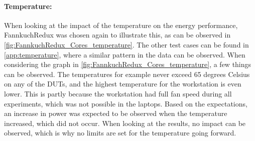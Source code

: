 

\paragraph{Temperature:} When looking at the impact of the temperature on the energy performance, FannkuchRedux was chosen again to illustrate this, as can be observed in \cref{fig:FannkuchRedux_Cores_temperature}. The other test cases can be found in \cref{app:temperature}, where a similar pattern in the data can be observed. When considering the graph in \cref{fig:FannkuchRedux_Cores_temperature}, a few things can be observed. The temperatures for example never exceed 65 degrees Celsius on any of the DUTs, and the highest temperature for the workstation is even lower. This is partly because the workstation had full fan speed during all experiments, which was not possible in the laptops. Based on the expectations, an increase in power was expected to be observed when the temperature increased, which did not occur. When looking at the results, no impact can be observed, which is why no limits are set for the temperature going forward.